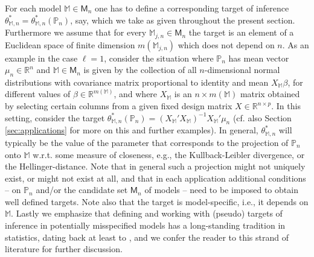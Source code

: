\documentclass[preprint]{imsart}
\newcommand{\R}{{\mathbb R}}
\renewcommand{\P}{{\mathbb P}}
\newcommand{\M}{\mathbb M}
\numberwithin{equation}{section}
\begin{document}
For each model $\mathbb{M} \in \mathsf{M}_n$ one has to define a corresponding target of inference $\theta^*_{\mathbb{M},n} = \theta^*_{\mathbb{M},n}(\mathbb{P}_n)$, say, which we take as given throughout the present section. Furthermore we assume that for every $\mathbb{M}_{j,n} \in \mathsf{M}_n$ the target is an element of a Euclidean space of finite dimension $m(\mathbb{M}_{j,n})$ which does not depend on $n$. As an example in the case $\ell=1$, consider the situation where $\P_n$ has mean vector $\mu_n\in\R^n$ and $\mathbb{M} \in \mathsf{M}_n$ is given by the collection of all $n$-dimensional normal distributions with covariance matrix proportional to identity and mean $X_\M\beta$, for different values of $\beta\in\R^{m(\M)}$, and where $X_\M$ is an $n\times m(\M)$ matrix obtained by selecting certain columns from a given fixed design matrix $X\in\R^{n\times p}$. In this setting, \cite{Berk13} consider the target $\theta_{\M,n}^*(\P_n) = (X_\M'X_\M)^{-1}X_\M'\mu_n$ (cf. also Section \ref{sec:applications} for more on this and further examples). In general, $\theta^*_{\mathbb{M},n}$ will typically be the value of the parameter that corresponds to the projection of $\mathbb{P}_n$ onto $\mathbb{M}$ w.r.t. some measure of closeness, e.g., the Kullback-Leibler divergence, or the Hellinger-distance. Note that in general such a projection might not uniquely exist, or might not exist at all, and that in each application additional conditions -- on $\mathbb{P}_n$ and/or the candidate set $\mathsf{M}_n$ of models -- need to be imposed to obtain well defined targets. Note also that the target is model-specific, i.e., it depends on $\mathbb{M}$. Lastly we emphasize that defining and working with (pseudo) targets of inference in potentially misspecified models has a long-standing tradition in statistics, dating back at least to \cite{Huber67}, and we confer the reader to this strand of literature for further discussion.
\end{document}
